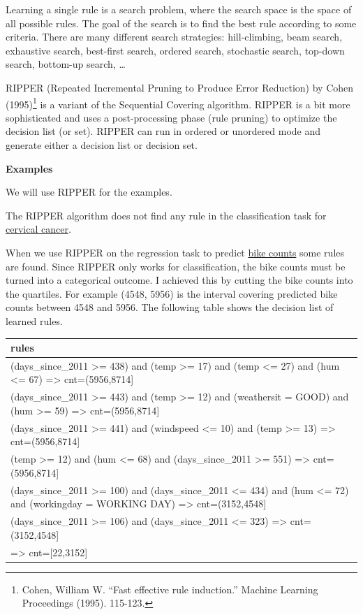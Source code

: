 \documentclass[12pt,]{krantz}
\begin{document}
Learning a single rule is a search problem, where the search space is
the space of all possible rules. The goal of the search is to find the
best rule according to some criteria. There are many different search
strategies: hill-climbing, beam search, exhaustive search, best-first
search, ordered search, stochastic search, top-down search, bottom-up
search, \ldots{}

RIPPER (Repeated Incremental Pruning to Produce Error Reduction) by
Cohen (1995)\footnote{Cohen, William W. ``Fast effective rule
  induction.'' Machine Learning Proceedings (1995). 115-123.} is a
variant of the Sequential Covering algorithm. RIPPER is a bit more
sophisticated and uses a post-processing phase (rule pruning) to
optimize the decision list (or set). RIPPER can run in ordered or
unordered mode and generate either a decision list or decision set.

\textbf{Examples}

We will use RIPPER for the examples.

The RIPPER algorithm does not find any rule in the classification task
for \protect\hyperlink{cervical}{cervical cancer}.

When we use RIPPER on the regression task to predict
\protect\hyperlink{bike-data}{bike counts} some rules are found. Since
RIPPER only works for classification, the bike counts must be turned
into a categorical outcome. I achieved this by cutting the bike counts
into the quartiles. For example (4548, 5956) is the interval covering
predicted bike counts between 4548 and 5956. The following table shows
the decision list of learned rules.

\begin{tabular}{>{\raggedright\arraybackslash}p{10cm}}
\hline
rules\\
\hline
(days\_since\_2011 >= 438) and (temp >= 17) and (temp <= 27) and (hum <= 67) => cnt=(5956,8714]\\
\hline
(days\_since\_2011 >= 443) and (temp >= 12) and (weathersit = GOOD) and (hum >= 59) => cnt=(5956,8714]\\
\hline
(days\_since\_2011 >= 441) and (windspeed <= 10) and (temp >= 13) => cnt=(5956,8714]\\
\hline
(temp >= 12) and (hum <= 68) and (days\_since\_2011 >= 551) => cnt=(5956,8714]\\
\hline
(days\_since\_2011 >= 100) and (days\_since\_2011 <= 434) and (hum <= 72) and (workingday = WORKING DAY) => cnt=(3152,4548]\\
\hline
(days\_since\_2011 >= 106) and (days\_since\_2011 <= 323) => cnt=(3152,4548]\\
\hline
=> cnt=[22,3152]\\
\hline
\end{tabular}
\end{document}
